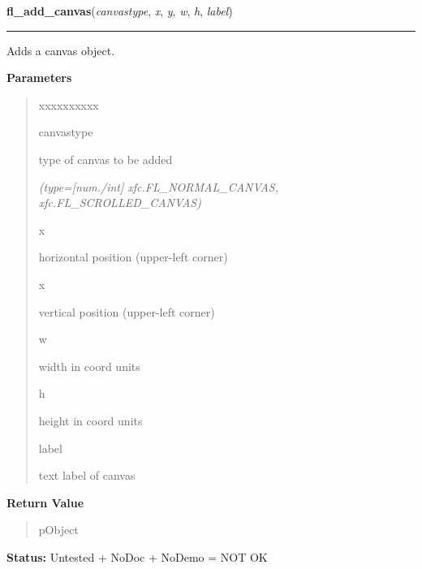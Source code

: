     \label{xformslib:library:fl_add_canvas}

    \vspace{0.5ex}

\hspace{.8\funcindent}\begin{boxedminipage}{\funcwidth}

    \raggedright \textbf{fl\_add\_canvas}(\textit{canvastype}, \textit{x}, \textit{y}, \textit{w}, \textit{h}, \textit{label})

    \vspace{-1.5ex}

    \rule{\textwidth}{0.5\fboxrule}
\setlength{\parskip}{2ex}
    Adds a canvas object.

\setlength{\parskip}{1ex}
      \textbf{Parameters}
      \vspace{-1ex}

      \begin{quote}
        \begin{Ventry}{xxxxxxxxxx}

          \item[canvastype]

          type of canvas to be added

            {\it (type=[num./int] xfc.FL\_NORMAL\_CANVAS, xfc.FL\_SCROLLED\_CANVAS)}

          \item[x]

          horizontal position (upper-left corner)

          \item[x]

          vertical position (upper-left corner)

          \item[w]

          width in coord units

          \item[h]

          height in coord units

          \item[label]

          text label of canvas

        \end{Ventry}

      \end{quote}

      \textbf{Return Value}
    \vspace{-1ex}

      \begin{quote}
      pObject

      \end{quote}

\textbf{Status:} Untested + NoDoc + NoDemo = NOT OK



    \end{boxedminipage}

